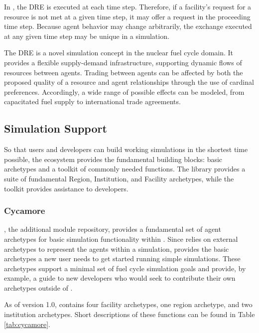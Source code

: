 In \Cyclus, the \gls{DRE} is executed at each time step. Therefore, if a
facility's request for a resource is not met at a given time step, it may offer
a request in the proceeding time step. Because agent behavior may change
arbitrarily, the exchange executed at any given time step may be unique in a
simulation.

The \gls{DRE} is a novel simulation concept in the nuclear fuel cycle domain. It
provides a flexible supply-demand infrastructure, supporting dynamic flows of
resources between agents. Trading between agents can be affected by both the
proposed quality of a resource and agent relationships through the use of
cardinal preferences. Accordingly, a wide range of possible effects can be
modeled, from capacitated fuel supply to international trade agreements.

\subsection{Simulation Support}
So that users and developers can build working simulations
in the shortest time possible, the \Cyclus ecosystem provides the fundamental
building blocks: basic archetypes and a toolkit of commonly needed functions.
The \Cycamore library provides a suite of fundamental Region, Institution, and
Facility archetypes, while the \Cyclus toolkit provides assistance to
developers.

\subsubsection{Cycamore}

\Cycamore \cite{carlsen_cycamore_2014}, the \Cyclus additional module
repository, provides a fundamental set of agent archetypes for basic simulation
functionality within \Cyclus.  Since \Cyclus relies on external
archetypes to represent the agents within a simulation, \Cycamore provides the
basic archetypes a new user needs to get started running simple simulations.
These archetypes support a minimal set of fuel cycle simulation goals and
provide, by example, a guide to new developers who would seek to contribute
their own archetypes outside of \Cycamore.

As of version 1.0, \Cycamore contains four facility archetypes, one region
archetype, and two institution archetypes. Short descriptions of these
functions can be found in Table \ref{tab:cycamore}.


